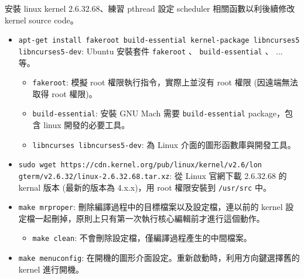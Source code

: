 \documentclass{res}
\begin{document}
 


\address{\\R03922106 蔡佑隆 unzledick@yahoo.com.tw\\ R04922067 楊翔雲 morris821028@gmail.com}

\begin{resume}

\vspace*{.1in} 

安裝 linux kernel 2.6.32.68、練習 pthread 設定 scheduler 相關函數以利後續修改 kernel source code。

\vspace*{.1in} 

\begin{itemize}
	\item \lstinline{apt-get install fakeroot build-essential kernel-package libncurses5 libncurses5-dev}: 
	Ubuntu 安裝套件 \lstinline{fakeroot} 、 \lstinline{build-essential} 、 ... 等。
	
	\begin{itemize}
		\item \lstinline{fakeroot}: 模擬 root 權限執行指令，實際上並沒有 root 權限 (因遠端無法取得 root 權限)。
		\item \lstinline{build-essential}: 安裝 GNU Mach 需要 \lstinline{build-essential} package，包含 linux 開發的必要工具。
		\item \lstinline{libncurses libncurses5-dev}: 為 Linux 介面的圖形函數庫與開發工具。
	\end{itemize}
	
	\item \lstinline{sudo wget https://cdn.kernel.org/pub/linux/kernel/v2.6/lon gterm/v2.6.32/linux-2.6.32.68.tar.xz}: 從 Linux 官網下載 2.6.32.68 的 kernal 版本 (最新的版本為 4.x.x)，用 root 權限安裝到 \lstinline{/usr/src} 中。
	
	\item \lstinline{make mrproper}: 刪除編譯過程中的目標檔案以及設定檔，連以前的 kernel 設定檔一起刪掉，原則上只有第一次執行核心編輯前才進行這個動作。
		\begin{itemize}
			\item \lstinline{make clean}: 不會刪除設定檔，僅編譯過程產生的中間檔案。
		\end{itemize}
	\item \lstinline{make menuconfig}: 在開機的圖形介面設定。重新啟動時，利用方向鍵選擇舊的 kernel 進行開機。
	

\end{itemize}
\end{resume}
\end{document}
